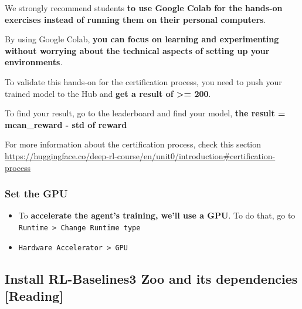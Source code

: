 \documentclass[11pt,a4paper]{article}
\begin{document}
We strongly recommend students \textbf{to use Google Colab for the hands-on exercises instead of running them on their personal computers}.

By using Google Colab, \textbf{you can focus on learning and experimenting without worrying about the technical aspects of setting up your environments}.

To validate this hands-on for the certification process, you need to push your trained model to the Hub and \textbf{get a result of \textgreater= 200}.

To find your result, go to the leaderboard and find your model, \textbf{the result = mean\_reward - std of reward}

For more information about the certification process, check this section \url{https://huggingface.co/deep-rl-course/en/unit0/introduction#certification-process}

\subsubsection{Set the GPU}\label{set-the-gpu}

\begin{itemize}
\tightlist
\item
  To \textbf{accelerate the agent's training, we'll use a GPU}. To do that, go to \texttt{Runtime\ \textgreater{}\ Change\ Runtime\ type}
\end{itemize}


\begin{itemize}
\tightlist
\item
  \texttt{Hardware\ Accelerator\ \textgreater{}\ GPU}
\end{itemize}


\subsection{Install RL-Baselines3 Zoo and its dependencies {[}Reading{]}}\label{install-rl-baselines3-zoo-and-its-dependencies-reading}
\end{document}
